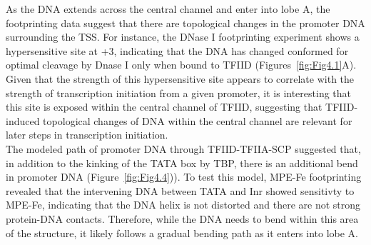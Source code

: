 \indent As the DNA extends across the central channel and enter into lobe A, the footprinting data suggest that there are topological changes in the promoter DNA surrounding the TSS. For instance, the DNase I footprinting experiment shows a hypersensitive site at +3, indicating that the DNA has changed conformed for optimal cleavage by Dnase I only when bound to TFIID (Figures~\ref{fig:Fig4.1}A). Given that the strength of this hypersensitive site appears to correlate with the strength of transcription initiation from a given promoter, it is interesting that this site is exposed within the central channel of TFIID, suggesting that TFIID-induced topological changes of DNA within the central channel are relevant for later steps in transcription initiation. \\
\indent The modeled path of promoter DNA through TFIID-TFIIA-SCP suggested that, in addition to the kinking of the TATA box by TBP, there is an additional bend in promoter DNA (Figure~\ref{fig:Fig4.4})). To test this model, MPE-Fe footprinting revealed that the intervening DNA between TATA and Inr showed sensitivty to MPE-Fe, indicating that the DNA helix is not distorted and there are not strong protein-DNA contacts. Therefore, while the DNA needs to bend within this area of the structure, it likely follows a gradual bending path as it enters into lobe A.\\

